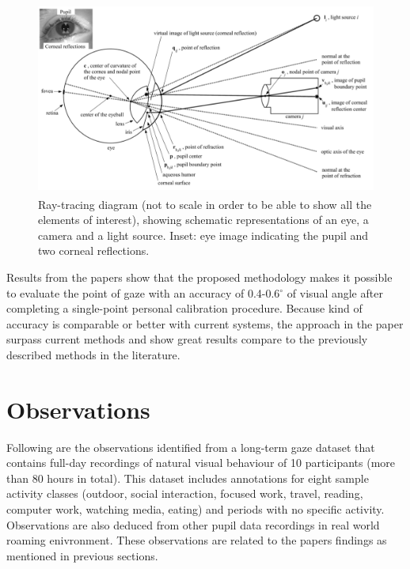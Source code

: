 \begin{figure}[!hbt]
  \centering
  \includegraphics[width=4.5in,height=2.5in]{elias.png}
  \caption{Ray-tracing diagram (not to scale in order to be able to show all the elements of interest), showing schematic representations of an eye, a camera and a light source. Inset: eye image indicating the pupil and two corneal reflections.}
  \label{elias}
\end{figure}


Results from the papers show that the proposed methodology makes it possible to evaluate the point of gaze with an accuracy of 0.4-0.6$^{\circ}$ of visual angle after completing a single-point personal calibration procedure. Because kind of accuracy is comparable or better with current systems, the approach in the paper surpass current methods and show great results compare to the previously described methods in the literature.


\newpage

\section{Observations}

Following are the observations identified from a long-term gaze dataset \cite{28} that contains full-day recordings of natural visual behaviour of 10 participants (more than 80 hours in total). This dataset includes annotations for eight sample activity classes (outdoor, social interaction, focused work, travel, reading, computer work, watching media, eating) and periods with no specific activity. Observations are also deduced from other pupil data recordings in real world roaming enivronment. These observations are related to the papers findings as mentioned in previous sections.\\

